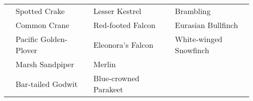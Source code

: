 \documentclass{article}
\begin{document}
\begin{center}
\begin{tabularx}{\textwidth}{cXcXcX}
\underline{\hspace{3ex}} 	 &Spotted Crake 	 &\underline{\hspace{3ex}} 	 &Lesser Kestrel 	 &\underline{\hspace{3ex}} 	 &Brambling \\ 
\underline{\hspace{3ex}} 	 &Common Crane 	 &\underline{\hspace{3ex}} 	 &Red-footed Falcon 	 &\underline{\hspace{3ex}} 	 &Eurasian Bullfinch \\ 
\underline{\hspace{3ex}} 	 &Pacific Golden-Plover 	 &\underline{\hspace{3ex}} 	 &Eleonora's Falcon 	 &\underline{\hspace{3ex}} 	 &White-winged Snowfinch \\ 
\underline{\hspace{3ex}} 	 &Marsh Sandpiper 	 &\underline{\hspace{3ex}} 	 &Merlin 	 &\underline{\hspace{3ex}} 	 &\underline{\hfill} \\ 
\underline{\hspace{3ex}} 	 &Bar-tailed Godwit 	 &\underline{\hspace{3ex}} 	 &Blue-crowned Parakeet 	 &\underline{\hspace{3ex}} 	 &\underline{\hfill} \\ 
\hline
\end{tabularx} 
\end{center}
\end{document}
